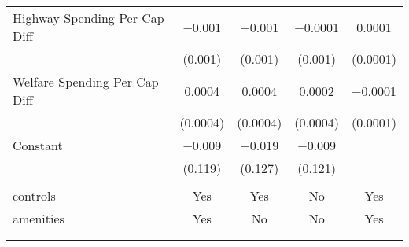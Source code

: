 \begin{table}[!htbp]
\begin{tabular}{@{\extracolsep{5pt}}lcccc}
  Highway Spending Per Cap Diff & $-$0.001 & $-$0.001 & $-$0.0001 & 0.0001 \\ 
  & (0.001) & (0.001) & (0.001) & (0.0001) \\ 
  Welfare Spending Per Cap Diff & 0.0004 & 0.0004 & 0.0002 & $-$0.0001 \\ 
  & (0.0004) & (0.0004) & (0.0004) & (0.0001) \\ 
  Constant & $-$0.009 & $-$0.019 & $-$0.009 &  \\ 
  & (0.119) & (0.127) & (0.121) &  \\ 
 \hline \\[-1.8ex] 
controls & Yes & Yes & No & Yes \\ 
amenities & Yes & No & No & Yes \\ 
\hline \\[-1.8ex] 
\hline 
\hline \\[-1.8ex] 
\end{tabular} 
\end{table} 
